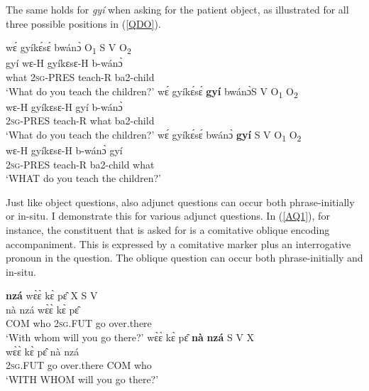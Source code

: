 \noindent The same holds for {\itshape gyí} when asking for the patient object, as illustrated for all three possible positions in (\ref{QDO}).

\begin{exe}
\ex\label{QDO} 
\begin{xlist}
\ex \label{QDO1}
   wɛ́ gyíkɛ́sɛ́ bwánɔ̀ \hfill O\textsubscript{1} S V O\textsubscript{2}  \\
         gyí wɛ-H gyíkɛsɛ-H b-wánɔ̀ \\
         what 2\textsc{sg}-PRES teach-R ba2-child  \\
    \trans `What do you teach the children?'
\ex\label{QDO2}
  \glll  wɛ́ gyíkɛ́sɛ́ {\bfseries gyí} bwánɔ̀\hfill S V O\textsubscript{1} O\textsubscript{2} \\
         wɛ-H gyíkɛsɛ-H gyí b-wánɔ̀ \\
            2\textsc{sg}-PRES teach-R what ba2-child  \\
    \trans `What do you teach the children?'
\ex\label{QDO3}
  \glll  wɛ́ gyíkɛ́sɛ́ bwánɔ̀ {\bfseries gyí} \hfill S V O\textsubscript{1} O\textsubscript{2} \\
           wɛ-H gyíkɛsɛ-H  b-wánɔ̀ gyí \\
           2\textsc{sg}-PRES teach-R ba2-child what \\
    \trans `WHAT do you teach the children?'
\end{xlist}
\end{exe}



Just like object questions, also adjunct questions can occur both phrase-initially or in-situ. I demonstrate this for various adjunct questions.
In (\ref{AQ1}), for instance, the constituent that is asked for is a comitative oblique encoding accompaniment. This is expressed by a comitative marker plus an interrogative pronoun in the question. The oblique question can occur both phrase-initially and in-situ.

\begin{exe}
\ex\label{AQ1}
\begin{xlist}
\ex\label{AQ1a}
   {\bfseries nzá} wɛ̀ɛ̀ kɛ̀ pɛ̂ \hfill X S V \\
          nà nzá wɛ̀ɛ̀ kɛ̀ pɛ̂ \\
             COM who 2\textsc{sg}.FUT go over.there  \\
    \trans `With whom will you go there?'
\ex\label{AQ1b}
  \glll wɛ̀ɛ̀ kɛ̀ pɛ̂ {\bfseries nà} {\bfseries nzá} \hfill S V X \\
           wɛ̀ɛ̀ kɛ̀ pɛ̂ nà nzá \\
           2\textsc{sg}.FUT go over.there COM who \\
       \trans `WITH WHOM will you go there?'
\end{xlist}
\end{exe}


